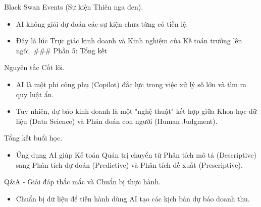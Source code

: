 \documentclass[aspectratio=169]{beamer}
\begin{document}
\begin{frame}{Black Swan Events (Sự kiện Thiên nga đen).}
    \begin{itemize}
        \item AI không giỏi dự đoán các sự kiện chưa từng có tiền lệ.
        \item Đây là lúc Trực giác kinh doanh và Kinh nghiệm của Kế toán trưởng lên ngôi.
        ### Phần 5: Tổng kết
    \end{itemize}
\end{frame}


\begin{frame}{Nguyên tắc Cốt lõi.}
    \begin{itemize}
        \item AI là một phi công phụ (Copilot) đắc lực trong việc xử lý số lớn và tìm ra quy luật ẩn.
        \item Tuy nhiên, dự báo kinh doanh là một "nghệ thuật" kết hợp giữa Khoa học dữ liệu (Data Science) và Phán đoán con người (Human Judgment).
    \end{itemize}
\end{frame}


\begin{frame}{Tổng kết buổi học.}
    \begin{itemize}
        \item Ứng dụng AI giúp Kế toán Quản trị chuyển từ Phân tích mô tả (Descriptive) sang Phân tích dự đoán (Predictive) và Phân tích đề xuất (Prescriptive).
    \end{itemize}
\end{frame}


\begin{frame}{Q\&A - Giải đáp thắc mắc và Chuẩn bị thực hành.}
    \begin{itemize}
        \item Chuẩn bị dữ liệu để tiến hành dùng AI tạo các kịch bản dự báo doanh thu.
    \end{itemize}
\end{frame}
\end{document}
